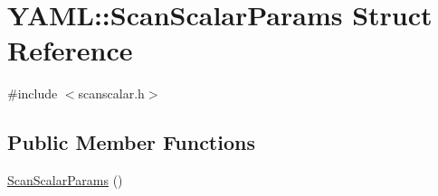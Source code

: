 \hypertarget{struct_y_a_m_l_1_1_scan_scalar_params}{}\section{Y\+A\+ML\+::Scan\+Scalar\+Params Struct Reference}
\label{struct_y_a_m_l_1_1_scan_scalar_params}


{\ttfamily \#include $<$scanscalar.\+h$>$}

\subsection*{Public Member Functions}
\begin{DoxyCompactItemize}
\item 
\mbox{\hyperlink{struct_y_a_m_l_1_1_scan_scalar_params_a2bdf208a85fef3fde0496e500a112787}{Scan\+Scalar\+Params}} ()
\end{DoxyCompactItemize}
